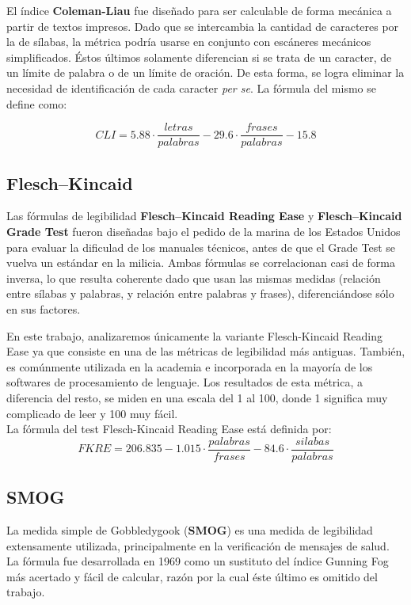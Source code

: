 \documentclass[12pt,journal,compsoc]{IEEEtran}
\begin{document}
El índice \textbf{Coleman-Liau}\cite{coleman-liau} fue diseñado para ser calculable de forma mecánica a partir de textos impresos. Dado que se intercambia la cantidad de caracteres por la de sílabas, la métrica podría usarse en conjunto con escáneres mecánicos simplificados. Éstos últimos solamente diferencian si se trata de un caracter, de un límite de palabra o de un límite de oración. De esta forma, se logra eliminar la necesidad de identificación de cada caracter \textit{per se}.
La fórmula del mismo se define como:

$$CLI = 5.88 \cdot \frac{letras}{palabras} - 29.6 \cdot \frac{frases}{palabras} - 15.8$$


\subsection{Flesch–Kincaid}
Las fórmulas de legibilidad \textbf{Flesch–Kincaid Reading Ease}\cite{ari-flesch} y \textbf{Flesch–Kincaid Grade Test} fueron diseñadas bajo el pedido de la marina de los Estados Unidos para evaluar la dificulad de los manuales técnicos, antes de que el Grade Test se vuelva un estándar en la milicia. Ambas fórmulas se correlacionan casi de forma inversa, lo que resulta coherente dado que usan las mismas medidas (relación entre sílabas y palabras, y relación entre palabras y frases), diferenciándose sólo en sus factores.

En este trabajo, analizaremos únicamente la variante Flesch-Kincaid Reading Ease ya que consiste en una de las métricas de legibilidad más antiguas. También, es comúnmente utilizada en la academia e incorporada en la mayoría de los softwares de procesamiento de lenguaje. Los resultados de esta métrica, a diferencia del resto, se miden en una escala del 1 al 100, donde 1 significa muy complicado de leer y 100 muy fácil.\\

La fórmula del test Flesch-Kincaid Reading Ease está definida por:
$$FKRE = 206.835 - 1.015\cdot \frac{palabras}{frases} - 84.6\cdot \frac{silabas}{palabras}$$

\subsection{SMOG}
La medida simple de Gobbledygook (\textbf{SMOG})\cite{smog} es una medida de legibilidad extensamente utilizada, principalmente en la verificación de mensajes de salud\cite{hedman}. La fórmula fue desarrollada en 1969 como un sustituto del índice Gunning Fog más acertado y fácil de calcular, razón por la cual éste último es omitido del trabajo.
\end{document}
